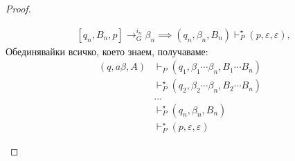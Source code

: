 \begin{proof}
\begin{enumerate}[1)]
\begin{description}
\begin{align*}
        & [q_n,B_n,p] \rightarrow^{i_n}_G \beta_n \implies (q_n,\beta_n,B_n) \vdash^\star_P (p,\varepsilon,\varepsilon),
      \end{align*}
      Обединявайки всичко, което знаем, получаваме:
      \begin{align*}
        (q, a\beta, A) & \vdash_P (q_1, \beta_1\cdots\beta_n, B_1\cdots B_n)\\
        & \vdash^\star_P (q_2, \beta_{2}\cdots\beta_n, B_2\cdots B_n)\\
        & \dots\\
        & \vdash^\star_P (q_n, \beta_n, B_n)\\
        & \vdash^\star_P (p, \varepsilon, \varepsilon)
      \end{align*}
    \end{description}
  \end{enumerate}
\end{proof}


